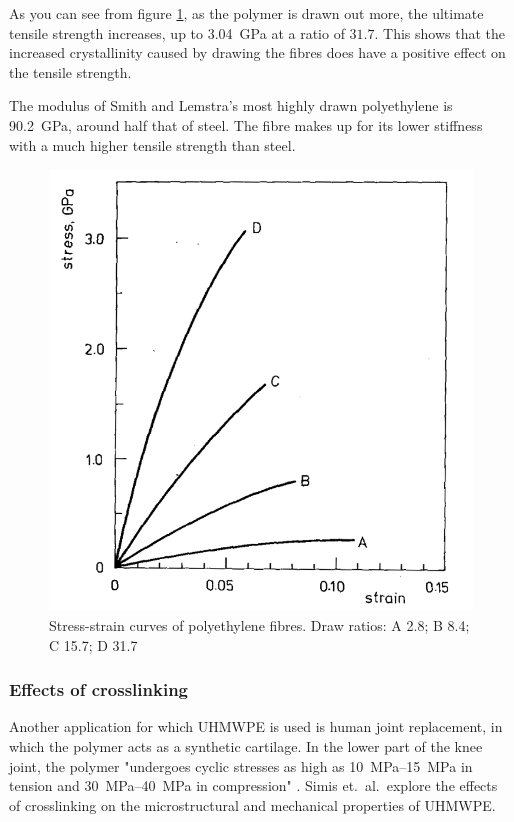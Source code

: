 As you can see from figure \ref{fig:pe_fibre_ss}, as the polymer is drawn out more, the ultimate tensile strength increases, up to \SI{3.04}{\giga\pascal} at a ratio of $31.7$. This shows that the increased crystallinity caused by drawing the fibres does have a positive effect on the tensile strength.

The modulus of Smith and Lemstra's most highly drawn polyethylene is \SI{90.2}{\giga\pascal}, around half that of steel. The fibre makes up for its lower stiffness with a much higher tensile strength than steel.

\begin{figure}
\centering
\includegraphics[width=0.8\columnwidth]{images/pe_stress_strain}
\caption{Stress-strain curves of polyethylene fibres. Draw ratios: A 2.8; B 8.4; C 15.7; D 31.7 }
\label{fig:pe_fibre_ss}
\end{figure}

\subsubsection{Effects of crosslinking}
Another application for which UHMWPE is used is  human joint replacement, in which the polymer acts as a synthetic cartilage. In the lower part of the knee joint, the polymer "undergoes cyclic stresses as high as \SIrange{10}{15}{\mega\pascal} in tension and \SIrange{30}{40}{\mega\pascal} in compression" . Simis et.\ al.\ explore the effects of crosslinking on the microstructural and mechanical properties of UHMWPE.

